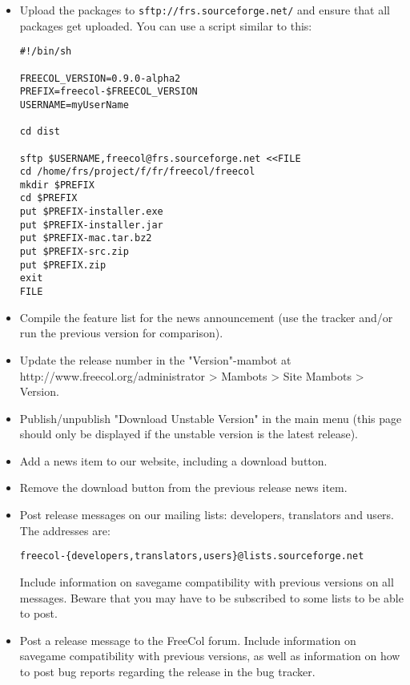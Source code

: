 \documentclass[12pt]{book}
\begin{document}
\begin{itemize}
\item Upload the packages to \verb$sftp://frs.sourceforge.net/$ and ensure that
  all packages get uploaded. You can use a script similar to this:

\begin{verbatim}
#!/bin/sh

FREECOL_VERSION=0.9.0-alpha2
PREFIX=freecol-$FREECOL_VERSION
USERNAME=myUserName

cd dist

sftp $USERNAME,freecol@frs.sourceforge.net <<FILE
cd /home/frs/project/f/fr/freecol/freecol
mkdir $PREFIX
cd $PREFIX
put $PREFIX-installer.exe
put $PREFIX-installer.jar
put $PREFIX-mac.tar.bz2
put $PREFIX-src.zip
put $PREFIX.zip
exit
FILE
\end{verbatim}

\item Compile the feature list for the news announcement (use the tracker
  and/or run the previous version for comparison).

\item Update the release number in the "Version"-mambot at
  http://www.freecol.org/administrator > Mambots > Site Mambots > Version.

\item Publish/unpublish "Download Unstable Version" in the main menu
  (this page should only be displayed if the unstable version is the
  latest release).

\item Add a news item to our website, including a download button.

\item Remove the download button from the previous release news item.

\item Post release messages on our mailing lists: developers,
  translators and users.  The addresses are:

\verb+freecol-{developers,translators,users}@lists.sourceforge.net+

Include information on savegame compatibility with previous versions
on all messages.  Beware that you may have to be subscribed to some
lists to be able to post.

\item Post a release message to the FreeCol forum. Include information
  on savegame compatibility with previous versions, as well as
  information on how to post bug reports regarding the release in the
  bug tracker.

\end{itemize}
\end{document}
